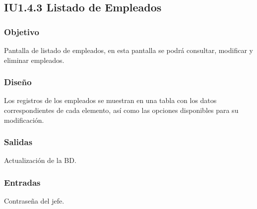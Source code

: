 \newpage
\subsection{IU1.4.3 Listado de Empleados}

\subsubsection{Objetivo}
	Pantalla de listado de empleados, en esta pantalla se podrá consultar, modificar y eliminar empleados.  

\subsubsection{Diseño}
	Los registros de los empleados se muestran en una tabla con los datos correspondientes de cada elemento, así como las opciones disponibles para su modificación. 


\subsubsection{Salidas}
	\begin{Citemize}
		\item Actualización de la BD. 
	\end{Citemize}
	
\subsubsection{Entradas}
	\begin{Citemize}
		\item Contraseña del jefe.
	\end{Citemize}

